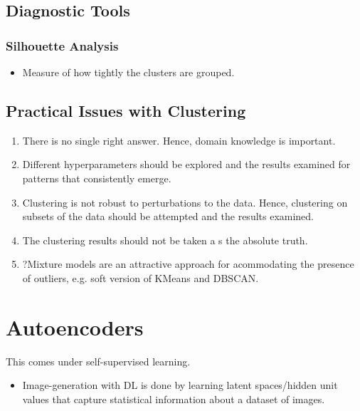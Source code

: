 \documentclass[a4paper, 12pt]{report}
\begin{document}

\section{Diagnostic Tools}
\subsection{Silhouette Analysis}
\label{subsec:silanalysis}
\begin{itemize}
\item Measure of how tightly the clusters are grouped.
\end{itemize}

\section{Practical Issues with Clustering}
\begin{enumerate}
\item There is no single right answer. Hence, domain knowledge is important.
\item Different hyperparameters should be explored and the results examined for patterns that consistently emerge.
\item Clustering is not robust to perturbations to the data. Hence, clustering on subsets of the data should be attempted and the results examined.
\item The clustering results should not be taken a s the absolute truth.
\item {\color{red}?}Mixture models are an attractive approach for acommodating the presence of outliers, e.g. soft version of KMeans and DBSCAN.
\end{enumerate}

\chapter{Autoencoders}
This comes under self-supervised learning.
\begin{itemize}
\item Image-generation with DL is done by learning latent spaces/hidden unit values that capture statistical information about a dataset of images.
\end{itemize}
\end{document}

